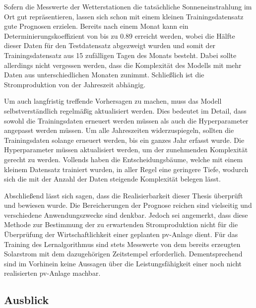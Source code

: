 \documentclass[12pt, a4paper]{article}
\begin{document}

Sofern die Messwerte der Wetterstationen die tatsächliche Sonneneinstrahlung im Ort gut repräsentieren, lassen sich schon mit einem kleinen Trainingsdatensatz gute Prognosen erzielen. Bereits nach einem Monat kann ein Determinierungskoeffizient von bis zu 0.89 erreicht werden, wobei die Hälfte dieser Daten für den Testdatensatz abgezweigt wurden und somit der Trainingsdatensatz aus 15 zufälligen Tagen des Monats besteht. Dabei sollte allerdings nicht vergessen werden, dass die Komplexität des Modells mit mehr Daten aus unterschiedlichen Monaten zunimmt. Schließlich ist die Stromproduktion von der Jahreszeit abhängig. 

Um auch langfristig treffende Vorhersagen zu machen, muss das Modell selbstverständlich regelmäßig aktualisiert werden. Dies bedeutet im Detail, dass sowohl die Trainingsdaten erneuert werden müssen als auch die Hyperparameter angepasst werden müssen. Um alle Jahreszeiten widerzuspiegeln, sollten die Trainingsdaten solange erneuert werden, bis ein ganzes Jahr erfasst wurde. Die Hyperparameter müssen aktualisiert werden, um der zunehmenden Komplexität gerecht zu werden. Vollends haben die Entscheidungsbäume, welche mit einem kleinem Datensatz trainiert wurden, in aller Regel eine geringere Tiefe, wodurch sich die mit der Anzahl der Daten steigende Komplexität belegen lässt.

Abschließend lässt sich sagen, dass die Realisierbarkeit dieser Thesis überprüft und bewiesen wurde. Die Bereicherungen der Prognose reichen sind vielseitig und verschiedene Anwendungszwecke sind denkbar. Jedoch sei angemerkt, dass diese Methode zur Bestimmung der zu erwartenden Stromproduktion nicht für die Überprüfung der Wirtschaftlichkeit einer geplanten \ac{pv}-Anlage dient. Für das Training des Lernalgorithmus sind stets Messwerte von dem bereits erzeugten Solarstrom mit dem dazugehörigen Zeitstempel erforderlich. Dementsprechend sind im Vorhinein keine Aussagen über die Leistungsfähigkeit einer noch nicht realisierten \ac{pv}-Anlage machbar.

\newpage

\subsection{Ausblick}
\label{subsec:outlook}
\end{document}
